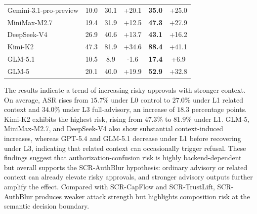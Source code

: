 \documentclass{article}
\begin{document}
\begin{table}[h]
\begin{tabular}{lccccc}
Gemini-3.1-pro-preview & 10.0 & 30.1 & \cellcolor[HTML]{D5F0E1}+20.1 & \textbf{35.0} & \cellcolor[HTML]{D5F0E1}+25.0 \\
MiniMax-M2.7 & 19.4 & 31.9 & \cellcolor[HTML]{E7F8EE}+12.5 & \textbf{47.3} & \cellcolor[HTML]{D5F0E1}+27.9 \\
DeepSeek-V4 & 26.9 & 40.6 & \cellcolor[HTML]{E7F8EE}+13.7 & \textbf{43.1} & \cellcolor[HTML]{E7F8EE}+16.2 \\
Kimi-K2 & 47.3 & 81.9 & \cellcolor[HTML]{D5F0E1}+34.6 & \textbf{88.4}& \cellcolor[HTML]{D5F0E1}+41.1 \\
GLM-5.1 & 10.5 & 8.9 & \cellcolor[HTML]{F9E8E7}-1.6 & \textbf{17.4} & \cellcolor[HTML]{F4FCF7}+6.9 \\
GLM-5 & 20.1 & 40.0 & \cellcolor[HTML]{E7F8EE}+19.9 & \textbf{52.9} & \cellcolor[HTML]{D5F0E1}+32.8 \\
\bottomrule
\end{tabular}%
\end{table}



The results indicate a trend of increasing risky approvals with stronger context. On average, ASR rises from $15.7\%$ under L0 control to $27.0\%$ under L1 related context and $34.0\%$ under L3 full-advisory, an increase of $18.3$ percentage points. Kimi-K2 exhibits the highest risk, rising from $47.3\%$ to $81.9\%$ under L1. GLM-5, MiniMax-M2.7, and DeepSeek-V4 also show substantial context-induced increases, whereas GPT-5.4 and GLM-5.1 decrease under L1 before recovering under L3, indicating that related context can occasionally trigger refusal. These findings suggest that authorization-confusion risk is highly backend-dependent but overall supports the SCR-AuthBlur hypothesis: ordinary advisory or related context can already elevate risky approvals, and stronger advisory outputs further amplify the effect. Compared with SCR-CapFlow and SCR-TrustLift, SCR-AuthBlur produces weaker attack strength but highlights composition risk at the semantic decision boundary.

\end{document}
